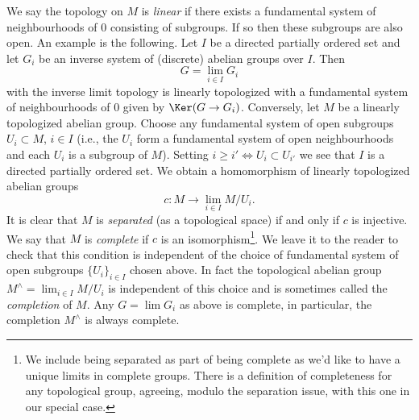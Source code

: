 \medskip\noindent
We say the topology on $M$ is {\it linear} if there exists a fundamental
system of neighbourhoods of $0$ consisting of subgroups. If so then these
subgroups are also open. An example is the following. Let $I$ be a directed
partially ordered set and let $G_i$ be an inverse system of (discrete)
abelian groups over $I$. Then
$$
G = \lim_{i \in I} G_i
$$
with the inverse limit topology is linearly topologized with a fundamental
system of neighbourhoods of $0$ given by $\Ker(G \to G_i)$.
Conversely, let $M$ be a linearly topologized abelian group.
Choose any fundamental system of open subgroups $U_i \subset M$, $i \in I$
(i.e., the $U_i$ form a fundamental system of open neighbourhoods and
each $U_i$ is a subgroup of $M$). Setting
$i \geq i' \Leftrightarrow U_i \subset U_{i'}$ we see that $I$
is a directed partially ordered set. We obtain a homomorphism of
linearly topologized abelian groups
$$
c : M \longrightarrow \lim_{i \in I} M/U_i.
$$
It is clear that $M$ is {\it separated} (as a topological space)
if and only if $c$ is injective. We say that $M$ is {\it complete}
if $c$ is an isomorphism\footnote{We include being separated as part
of being complete as we'd like to have a unique limits in complete
groups. There is a definition of completeness for any topological group,
agreeing, modulo the separation issue, with this one in our special case.}.
We leave it to the reader to check that this condition is independent of
the choice of fundamental system of open subgroups $\{U_i\}_{i \in I}$
chosen above. In fact the topological abelian group
$M^\wedge = \lim_{i \in I} M/U_i$ is independent of this
choice and is sometimes called the {\it completion} of $M$.
Any $G = \lim G_i$ as above is complete, in particular,
the completion $M^\wedge$ is always complete.

